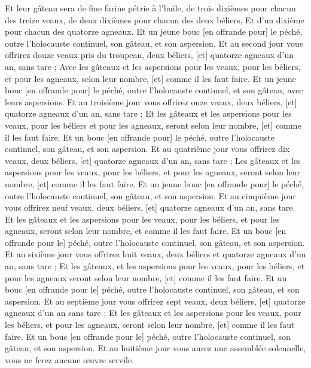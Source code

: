 \begin{multicols}{2}
Et leur gâteau sera de fine farine pétrie à l'huile, de trois dixièmes pour chacun des treize veaux, de deux dixièmes pour chacun des deux béliers,
Et d'un dixième pour chacun des quatorze agneaux.
Et un jeune bouc [en offrande pour] le péché, outre l'holocauste continuel, son gâteau, et son aspersion.
Et au second jour vous offrirez douze veaux pris du troupeau, deux béliers, [et] quatorze agneaux d'un an, sans tare ;
Avec les gâteaux et les aspersions pour les veaux, pour les béliers, et pour les agneaux, selon leur nombre, [et] comme il les faut faire.
Et un jeune bouc [en offrande pour] le péché, outre l'holocauste continuel, et son gâteau, avec leurs aspersions.
Et au troisième jour vous offrirez onze veaux, deux béliers, [et] quatorze agneaux d'un an, sans tare ;
Et les gâteaux et les aspersions pour les veaux, pour les béliers et pour les agneaux, seront selon leur nombre, [et] comme il les faut faire.
Et un bouc [en offrande pour] le péché, outre l'holocauste continuel, son gâteau, et son aspersion.
Et au quatrième jour vous offrirez dix veaux, deux béliers, [et] quatorze agneaux d'un an, sans tare ;
Les gâteaux et les aspersions pour les veaux, pour les béliers, et pour les agneaux, seront selon leur nombre, [et] comme il les faut faire.
Et un jeune bouc [en offrande pour] le péché, outre l'holocauste continuel, son gâteau, et son aspersion.
Et au cinquième jour vous offrirez neuf veaux, deux béliers, [et] quatorze agneaux d'un an, sans tare.
Et les gâteaux et les aspersions pour les veaux, pour les béliers, et pour les agneaux, seront selon leur nombre, et comme il les faut faire.
Et un bouc [en offrande pour le] péché, outre l'holocauste continuel, son gâteau, et son aspersion.
Et au sixième jour vous offrirez huit veaux, deux béliers et quatorze agneaux d'un an, sans tare ;
Et les gâteaux, et les aspersions pour les veaux, pour les béliers, et pour les agneaux seront selon leur nombre, [et] comme il les faut faire.
Et un bouc [en offrande pour le] péché, outre l'holocauste continuel, son gâteau, et son aspersion.
Et au septième jour vous offrirez sept veaux, deux béliers, [et] quatorze agneaux d'un an sans tare ;
Et les gâteaux et les aspersions pour les veaux, pour les béliers, et pour les agneaux, seront selon leur nombre, [et] comme il les faut faire.
Et un bouc [en offrande pour le] péché, outre l'holocauste continuel, son gâteau, et son aspersion.
Et au huitième jour vous aurez une assemblée solennelle, vous ne ferez aucune œuvre servile.

\end{multicols}
